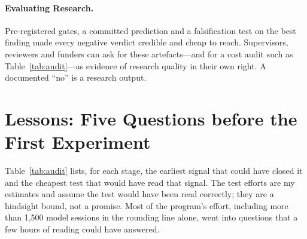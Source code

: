 \documentclass[11pt]{article}
\begin{document}
\paragraph{Evaluating Research.} Pre-registered gates, a committed prediction and a falsification test on the best finding made every negative verdict credible and cheap to reach. Supervisors, reviewers and funders can ask for these artefacts---and for a cost audit such as Table~\ref{tab:audit}---as evidence of research quality in their own right. A documented ``no'' is a research output.


\section{Lessons: Five Questions before the First Experiment}
\label{sec:lessons}

Table~\ref{tab:audit} lists, for each stage, the earliest signal that could have closed it and the cheapest test that would have read that signal. The test efforts are my estimates and assume the test would have been read correctly; they are a hindsight bound, not a promise. Most of the program's effort, including more than 1,500 model sessions in the rounding line alone, went into questions that a few hours of reading could have answered.
\end{document}
